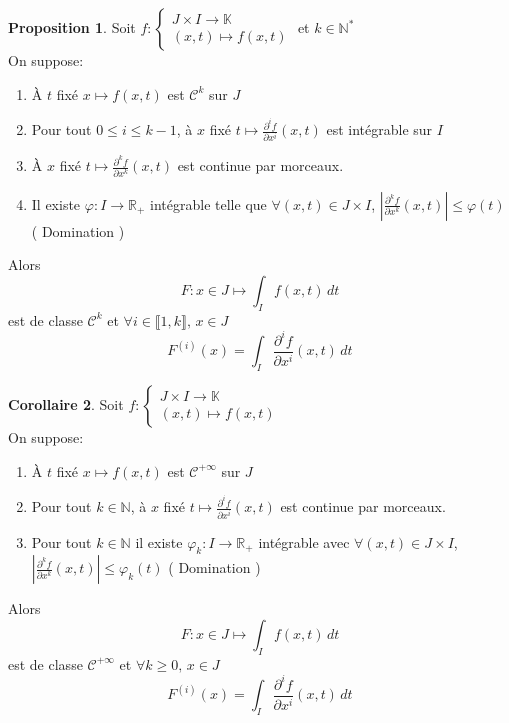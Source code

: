 \documentclass[10pt,a4paper]{article}
\theoremstyle{definition}
\newtheorem{proposition}{Proposition}[section]
\newtheorem{corollary}[proposition]{Corollaire}
\begin{document}
\begin{proposition}
    Soit \(f:\begin{cases} J \times I \to \mathbb{K} \\ (x, t) \mapsto f(x, t)\end{cases}\) et \(k \in \mathbb{N}^*\) \\
    On suppose:
    \begin{enumerate}
        \item À \(t\) fixé \(x \mapsto f(x, t)\) est \(\mathcal{C}^k\) sur \(J\)
        \item Pour tout \(0 \leq i \leq k - 1\), à \(x\) fixé \(t \mapsto \frac{\partial^i f}{\partial x^i}(x, t)\) est intégrable sur \(I\)
        \item À \(x\) fixé \(t \mapsto \frac{\partial^k f}{\partial x^k}(x, t)\) est continue par morceaux.
        \item Il existe \(\varphi: I \to \mathbb{R}_+\) intégrable telle que \(\forall (x, t) \in J \times I\), \(\left| \frac{\partial^k f}{\partial x^k}(x, t) \right| \leq \varphi(t)\) ( Domination )
    \end{enumerate}
    Alors \[F: x \in J \mapsto \int_{I} f(x, t) \,dt\] est de classe \(\mathcal{C}^k\) et \(\forall i \in \llbracket 1, k \rrbracket,\, x \in J\)
    \[\boxed{F^{(i)}(x) = \int_{I} \frac{\partial^i f}{\partial x^i}(x, t) \,dt}\]
\end{proposition}
\begin{corollary}
    Soit \(f:\begin{cases} J \times I \to \mathbb{K} \\ (x, t) \mapsto f(x, t)\end{cases}\) \\
    On suppose:
    \begin{enumerate}
        \item À \(t\) fixé \(x \mapsto f(x, t)\) est \(\mathcal{C}^{+\infty}\) sur \(J\)
        \item Pour tout \(k \in \mathbb{N}\), à \(x\) fixé \(t \mapsto \frac{\partial^i f}{\partial x^i}(x, t)\) est continue par morceaux.
        \item Pour tout \(k \in \mathbb{N}\) il existe \(\varphi_k: I \to \mathbb{R}_+\) intégrable avec \(\forall (x, t) \in J \times I\), \(\left| \frac{\partial^k f}{\partial x^k}(x, t) \right| \leq \varphi_k(t)\) ( Domination )
    \end{enumerate}
    Alors \[F: x \in J \mapsto \int_{I} f(x, t) \,dt\] est de classe \(\mathcal{C}^{+\infty}\) et \(\forall k \geq 0 ,\, x \in J\)
    \[\boxed{F^{(i)}(x) = \int_{I} \frac{\partial^i f}{\partial x^i}(x, t) \,dt}\]
\end{corollary}
\end{document}
